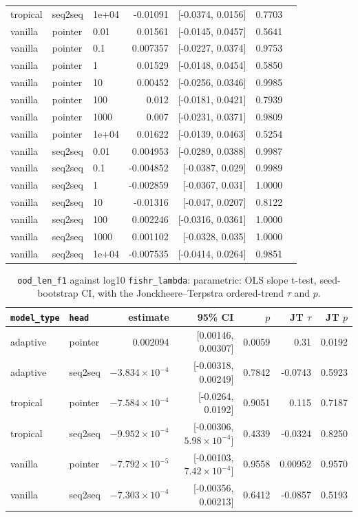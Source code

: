 \documentclass[10pt]{article}
\begin{document}
{\begin{longtable}{lllrrrl}
tropical & seq2seq & 1e+04 & -0.01091 & [-0.0374, 0.0156] & 0.7703 & \\
vanilla & pointer & 0.01 & 0.01561 & [-0.0145, 0.0457] & 0.5641 & \\
vanilla & pointer & 0.1 & 0.007357 & [-0.0227, 0.0374] & 0.9753 & \\
vanilla & pointer & 1 & 0.01529 & [-0.0148, 0.0454] & 0.5850 & \\
vanilla & pointer & 10 & 0.00452 & [-0.0256, 0.0346] & 0.9985 & \\
vanilla & pointer & 100 & 0.012 & [-0.0181, 0.0421] & 0.7939 & \\
vanilla & pointer & 1000 & 0.007 & [-0.0231, 0.0371] & 0.9809 & \\
vanilla & pointer & 1e+04 & 0.01622 & [-0.0139, 0.0463] & 0.5254 & \\
vanilla & seq2seq & 0.01 & 0.004953 & [-0.0289, 0.0388] & 0.9987 & \\
vanilla & seq2seq & 0.1 & -0.004852 & [-0.0387, 0.029] & 0.9989 & \\
vanilla & seq2seq & 1 & -0.002859 & [-0.0367, 0.031] & 1.0000 & \\
vanilla & seq2seq & 10 & -0.01316 & [-0.047, 0.0207] & 0.8122 & \\
vanilla & seq2seq & 100 & 0.002246 & [-0.0316, 0.0361] & 1.0000 & \\
vanilla & seq2seq & 1000 & 0.001102 & [-0.0328, 0.035] & 1.0000 & \\
vanilla & seq2seq & 1e+04 & -0.007535 & [-0.0414, 0.0264] & 0.9851 & \\
\bottomrule
\end{longtable}
}

{\small
\begin{longtable}{llrrrrr}
\caption{\texttt{ood\_len\_f1} against log10 \texttt{fishr\_lambda}: parametric: OLS slope t-test, seed-bootstrap CI, with the Jonckheere--Terpstra ordered-trend $\tau$ and $p$.}\label{tab:trend-ood_len_f1}\\
\toprule
\texttt{model\_type} & \texttt{head} & estimate & 95\% CI & $p$ & JT $\tau$ & JT $p$\\
\midrule
\endhead
adaptive & pointer & 0.002094 & [0.00146, 0.00307] & 0.0059 & 0.31 & 0.0192\\
adaptive & seq2seq & $-3.834\times10^{-4}$ & [-0.00318, 0.00249] & 0.7842 & -0.0743 & 0.5923\\
tropical & pointer & $-7.584\times10^{-4}$ & [-0.0264, 0.0192] & 0.9051 & 0.115 & 0.7187\\
tropical & seq2seq & $-9.952\times10^{-4}$ & [-0.00306, $5.98\times10^{-4}$] & 0.4339 & -0.0324 & 0.8250\\
vanilla & pointer & $-7.792\times10^{-5}$ & [-0.00103, $7.42\times10^{-4}$] & 0.9558 & 0.00952 & 0.9570\\
vanilla & seq2seq & $-7.303\times10^{-4}$ & [-0.00356, 0.00213] & 0.6412 & -0.0857 & 0.5193\\
\bottomrule
\end{longtable}
}
\end{document}

